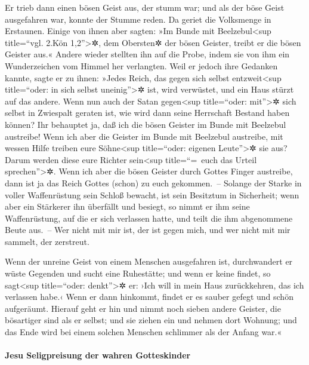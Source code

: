  Er trieb dann einen bösen Geist aus, der stumm war; und
als der böse Geist ausgefahren war, konnte der Stumme reden. Da geriet
die Volksmenge in Erstaunen.  Einige von ihnen aber
sagten: »Im Bunde mit Beelzebul\textless sup title=``vgl. 2.Kön
1,2''\textgreater✲, dem Obersten✲ der bösen Geister, treibt er die bösen
Geister aus.«  Andere wieder stellten ihn auf die Probe,
indem sie von ihm ein Wunderzeichen vom Himmel her verlangten.
 Weil er jedoch ihre Gedanken kannte, sagte er zu ihnen:
»Jedes Reich, das gegen sich selbst entzweit\textless sup title=``oder:
in sich selbst uneinig''\textgreater✲ ist, wird verwüstet, und ein Haus
stürzt auf das andere.  Wenn nun auch der Satan
gegen\textless sup title=``oder: mit''\textgreater✲ sich selbst in
Zwiespalt geraten ist, wie wird dann seine Herrschaft Bestand haben
können? Ihr behauptet ja, daß ich die bösen Geister im Bunde mit
Beelzebul austreibe!  Wenn ich aber die Geister im Bunde
mit Beelzebul austreibe, mit wessen Hilfe treiben eure
Söhne\textless sup title=``oder: eigenen Leute''\textgreater✲ sie aus?
Darum werden diese eure Richter sein\textless sup title=``=~euch das
Urteil sprechen''\textgreater✲.  Wenn ich aber die bösen
Geister durch Gottes Finger austreibe, dann ist ja das Reich Gottes
(schon) zu euch gekommen.~--  Solange der Starke in
voller Waffenrüstung sein Schloß bewacht, ist sein Besitztum in
Sicherheit;  wenn aber ein Stärkerer ihn überfällt und
besiegt, so nimmt er ihm seine Waffenrüstung, auf die er sich verlassen
hatte, und teilt die ihm abgenommene Beute aus.~--  Wer
nicht mit mir ist, der ist gegen mich, und wer nicht mit mir sammelt,
der zerstreut.

 Wenn der unreine Geist von einem Menschen ausgefahren
ist, durchwandert er wüste Gegenden und sucht eine Ruhestätte; und wenn
er keine findet, so sagt\textless sup title=``oder: denkt''\textgreater✲
er: ›Ich will in mein Haus zurückkehren, das ich verlassen habe.‹
 Wenn er dann hinkommt, findet er es sauber gefegt und
schön aufgeräumt.  Hierauf geht er hin und nimmt noch
sieben andere Geister, die bösartiger sind als er selbst; und sie ziehen
ein und nehmen dort Wohnung; und das Ende wird bei einem solchen
Menschen schlimmer als der Anfang war.«

\hypertarget{jesu-seligpreisung-der-wahren-gotteskinder}{%
\paragraph{Jesu Seligpreisung der wahren
Gotteskinder}\label{jesu-seligpreisung-der-wahren-gotteskinder}}

